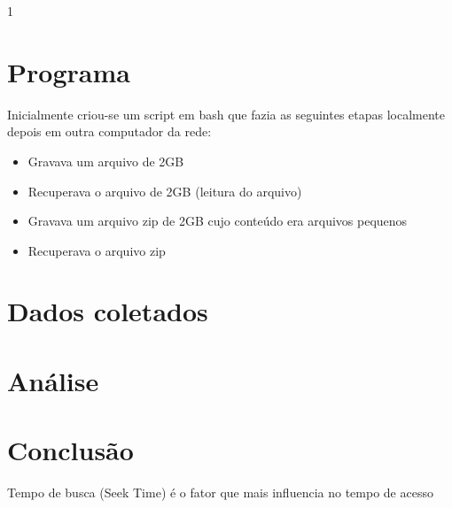 1\documentclass[10pt,a4paper]{article}
\begin{document}
\section{Programa}
Inicialmente criou-se um script em bash que fazia as seguintes etapas localmente depois em outra computador da rede:
\begin{itemize}
\item Gravava um arquivo de 2GB
\item Recuperava o arquivo de 2GB (leitura  do arquivo) 
\item Gravava um arquivo zip de 2GB cujo conteúdo era arquivos pequenos
\item Recuperava o arquivo zip
\end{itemize}


\section{Dados coletados}

\section{Análise}
\section{Conclusão}
Tempo de busca (Seek Time) é o fator que mais influencia no tempo de acesso 

%
%  
\end{document}
